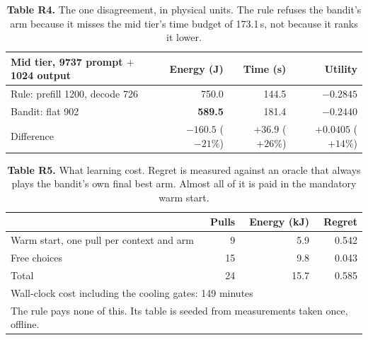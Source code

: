 \documentclass[10pt]{article}
\newcommand{\good}[1]{\textcolor{kvgreen}{\textbf{#1}}}
\newcommand{\bad}[1]{\textcolor{kvred}{#1}}
\begin{document}
\begin{table}[h]\centering\small
\caption*{\textbf{Table R4.} The one disagreement, in physical units. The rule refuses the bandit's arm
because it misses the mid tier's time budget of 173.1\,s, not because it ranks it lower.}
\begin{tabular}{l r r r}
\toprule
\textbf{Mid tier, 9737 prompt $+$ 1024 output} & \textbf{Energy (J)} & \textbf{Time (s)} & \textbf{Utility} \\
\midrule
Rule: prefill 1200, decode 726 & 750.0 & 144.5 & $-0.2845$ \\
Bandit: flat 902               & \good{589.5} & \bad{181.4} & \good{$-0.2440$} \\
\midrule
Difference & $-160.5$ ($-21\%$) & $+36.9$ ($+26\%$) & $+0.0405$ ($+14\%$) \\
\bottomrule
\end{tabular}
\end{table}

\begin{table}[h]\centering\small
\caption*{\textbf{Table R5.} What learning cost. Regret is measured against an oracle that always plays the
bandit's own final best arm. Almost all of it is paid in the mandatory warm start.}
\begin{tabular}{l r r r}
\toprule
 & \textbf{Pulls} & \textbf{Energy (kJ)} & \textbf{Regret} \\
\midrule
Warm start, one pull per context and arm & 9  & 5.9 & \bad{0.542} \\
Free choices                              & 15 & 9.8 & 0.043 \\
\midrule
Total                                     & 24 & \bad{15.7} & 0.585 \\
\midrule
\multicolumn{4}{l}{Wall-clock cost including the cooling gates: 149 minutes} \\
\multicolumn{4}{l}{The rule pays none of this. Its table is seeded from measurements taken once, offline.} \\
\bottomrule
\end{tabular}
\end{table}
\end{document}
